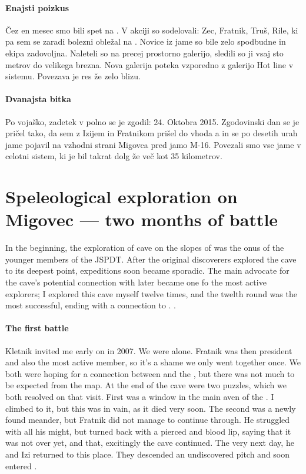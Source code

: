 \paragraph{Enajsti poizkus} Čez en mesec smo bili spet na . V akciji so sodelovali: Zec, Fratnik, Truš, Rile, ki pa sem se zaradi bolezni obležal na . Novice iz jame so bile zelo spodbudne in ekipa zadovoljna. Naleteli so na precej prostorno galerijo, sledili so ji vsaj sto metrov do velikega brezna. Nova galerija poteka vzporedno z galerijo Hot line v sistemu. Povezava je res že zelo blizu. 

\paragraph{Dvanajsta bitka} 
Po vojaško, zadetek v polno se je zgodil: 24. Oktobra 2015. Zgodovinski dan se je pričel tako, da sem z Izijem in Fratnikom prišel do vhoda a in se po desetih urah jame pojavil na vzhodni strani Migovca pred jamo M-16. Povezali smo vse jame v celotni sistem, ki je bil takrat dolg že več kot 35 kilometrov. 

\section{Speleological exploration on Migovec --- two months of battle}

In the beginning, the exploration of  cave on the slopes of  was the onus of the younger members of the JSPDT. After the original discoverers explored the cave to its deepest point, expeditions soon became sporadic. The main advocate for the cave's potential connection with  later became one fo the most active explorers; I explored this cave myself twelve times, and the twelth round was the most successful, ending  with a connection to . .

\paragraph{The first battle}
Kletnik invited me early on in 2007. We were alone. Fratnik was then president and also the most active member, so it's a shame we only went together once. We both were hoping for a connection between  and the , but there was not much to be expected from the map. At the end of the cave were two puzzles, which we both resolved on that visit. First was a window in the main aven of the . I climbed to it, but this was in vain, as it died very soon. The second was a newly found meander, but Fratnik did not manage to continue through. He struggled with all his might, but turned back with a pierced and blood lip, saying that it was not over yet, and that, excitingly the cave continued. The very next day, he and Izi returned to this place. They descended an undiscovered pitch and soon entered . 

